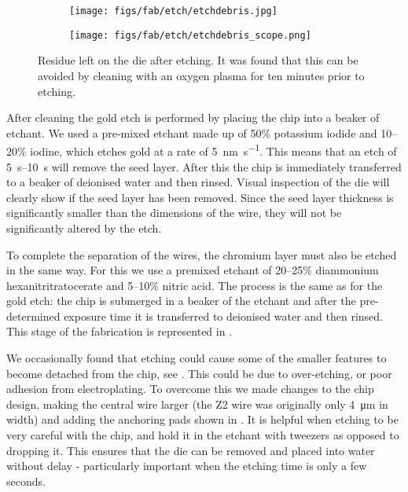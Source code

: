 \begin{figure}
  \centering
  \begin{subfigure}[b]{0.45\textwidth}
    \texttt{[image: figs/fab/etch/etchdebris.jpg]}
    \caption{}
  \end{subfigure}
  \hspace{1cm}
  \begin{subfigure}[b]{0.45\textwidth}
    \centering
    \texttt{[image: figs/fab/etch/etchdebris\_scope.png]}
    \caption{}
  \end{subfigure}
  \caption{Residue left on the die after etching. It was found that this can be
  avoided by cleaning with an oxygen plasma for ten minutes prior to etching.}
  \label{fab:fig:etchres}
\end{figure}

After cleaning the gold etch is performed by placing the chip into a beaker of
etchant. We used a pre-mixed etchant made up of 50\% potassium iodide and
\numrange{10}{20}\% iodine, which etches gold at a rate of
\SI{5}{\nano\meter\per\second}.  This means that an etch of
\SIrange{5}{10}{\second} will remove the seed layer. After this the chip is
immediately transferred to a beaker of deionised water and then rinsed.  Visual
inspection of the die will clearly show if the seed layer has been removed.
Since the seed layer thickness is significantly smaller than the dimensions of
the wire, they will not be significantly altered by the etch.

To complete the separation of the wires, the chromium layer must also be etched
in the same way. For this we use a premixed etchant of \numrange{20}{25}\%
diammonium hexanitritratocerate and \numrange{5}{10}\% nitric acid. The process
is the same as for the gold etch: the chip is submerged in a beaker of the
etchant and after the pre-determined exposure time it is transferred to
deionised water and then rinsed. This stage of the fabrication is represented
in . 

We occasionally found that etching could cause some of the smaller features to
become detached from the chip, see . This could be due to over-etching, or poor
adhesion from electroplating. To overcome this we made changes to the chip
design, making the central wire larger (the Z2 wire was originally only
\SI{4}{\micro\meter} in width) and adding the anchoring pads shown in
. It is helpful when etching to
be very careful with the chip, and hold it in the etchant with tweezers as
opposed to dropping it. This ensures that the die can be removed and placed
into water without delay - particularly important when the etching time is only
a few seconds.

